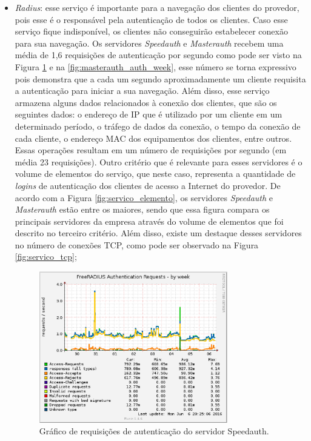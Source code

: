 \begin{itemize}
 \item \textit{Radius}: esse serviço é importante para a navegação dos clientes do provedor, pois esse é o responsável pela autenticação de 
 todos os clientes. Caso esse serviço fique indisponível, os clientes não conseguirão estabelecer conexão para sua navegação. Os servidores
 \textit{Speedauth} e \textit{Masterauth} recebem uma média de 1,6 requisições de autenticação por segundo como pode ser visto na Figura 
 \ref{fig:speedauth_auth_week} e na \ref{fig:masterauth_auth_week}, esse número se torna expressivo pois demonstra que a cada um segundo 
 aproximadamente um cliente requisita a autenticação para iniciar a sua navegação. Além disso, esse serviço armazena alguns dados relacionados 
 à conexão dos clientes, que são os seguintes dados: o endereço de \ac{IP} que é utilizado por um cliente em um determinado período, o tráfego 
 de dados da conexão, o tempo da conexão de cada cliente, o endereço \ac{MAC} dos equipamentos dos clientes, entre outros. Essas operações 
 resultam em um número de requisições por segundo (em média 23 requisições).
 Outro critério que é relevante para esses servidores é o volume de elementos do serviço, que neste caso, representa a quantidade de \textit{logins} 
 de autenticação dos clientes de acesso a Internet do provedor. De acordo com a Figura \ref{fig:servico_elemento}, os servidores \textit{Speedauth} 
 e \textit{Masterauth} estão entre os maiores, sendo que essa figura compara os principais servidores da empresa através do volume de elementos
 que foi descrito no terceiro critério. Além disso, existe um destaque desses servidores no número de conexões \ac{TCP}, como pode ser observado 
 na Figura \ref{fig:servico_tcp};
 
\begin{figure}[h!]
 \centering
 \includegraphics[width=310px]{img/speedauth_auth_week.eps}
 \caption{Gráfico de requisições de autenticação do servidor Speedauth.}
 \label{fig:speedauth_auth_week}
\end{figure}


\end{itemize}
